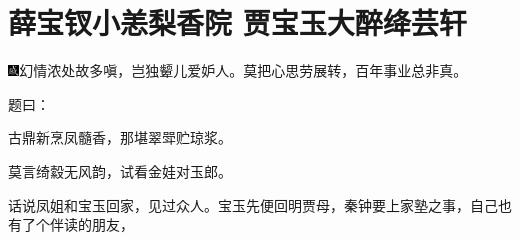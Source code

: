 

\chapter{薛宝钗小恙梨香院 贾宝玉大醉绛芸轩}
{\includegraphics[width=3mm]{../Images/00005}\kaishu 幻情浓处故多嗔，岂独颦儿爱妒人。莫把心思劳展转，百年事业总非真。}

题曰：

古鼎新烹凤髓香，那堪翠斝贮琼浆。

莫言绮縠无风韵，试看金娃对玉郎。

话说凤姐和宝玉回家，见过众人。宝玉先便回明贾母，秦钟要上家塾之事，自己也有了个伴读的朋友，